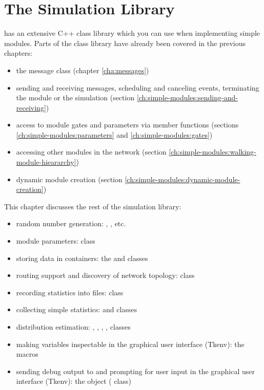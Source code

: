 \chapter{The Simulation Library}
\label{cha:the-simulation-library}

{\opp} has an extensive C++ class library which you can use when implementing
simple modules. Parts of the class library have already been covered in the
previous chapters:

\begin{itemize}
  \item{the message class  (chapter \ref{cha:messages})}
  \item{sending and receiving messages, scheduling and canceling
    events, terminating the module or the simulation
    (section \ref{ch:simple-modules:sending-and-receiving})}
  \item{access to module gates and parameters via  member functions
    (sections \ref{ch:simple-modules:parameters} and \ref{ch:simple-modules:gates})}
  \item{accessing other modules in the network (section \ref{ch:simple-modules:walking-module-hieararchy})}
  \item{dynamic module creation (section \ref{ch:simple-modules:dynamic-module-creation})}
\end{itemize}

This chapter discusses the rest of the simulation library:

\begin{itemize}
  \item{random number generation: ,
    , etc.}
  \item{module parameters:  class}
  \item{storing data in containers: the  and  classes}
  \item{routing support and discovery of network topology:  class}
  \item{recording statistics into files:  class}
  \item{collecting simple statistics:  and  classes}
  \item{distribution estimation: ,
    , , ,
     classes}
  \item{making variables inspectable in the graphical user interface (Tkenv):
        the  macros}
  \item{sending debug output to and prompting for user input in the graphical
    user interface (Tkenv): the  object ( class)}
\end{itemize}





